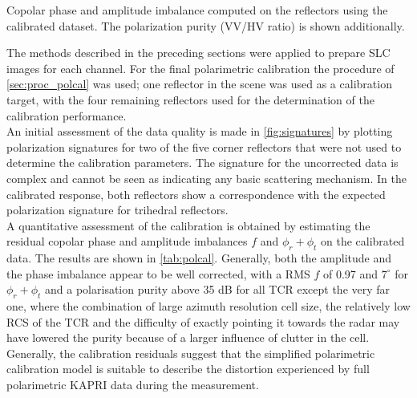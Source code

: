 								
\begin{table}[h]
	\centering
	\caption{Copolar phase and amplitude imbalance computed on the reflectors using the calibrated dataset. The polarization purity (VV/HV ratio) is shown additionally.}
	\label{tab:polcal}
\end{table}		
The methods described in the preceding sections were applied to prepare SLC images for each channel. For the final polarimetric calibration the procedure of \autoref{sec:proc_polcal} was used; one reflector in the scene was used as a calibration target, with the four remaining reflectors used for the determination of the calibration performance.\\
An initial assessment of the data quality is made in \autoref{fig:signatures}  by plotting polarization signatures\cite{VanZyl1987} for two of the five corner reflectors that were not used to determine the calibration parameters.
The signature for the uncorrected data is complex and cannot be seen as indicating any basic scattering mechanism. In the calibrated response, both reflectors show a correspondence with the expected polarization signature for trihedral reflectors.\\
A quantitative assessment of the calibration is obtained by estimating the residual copolar phase and amplitude imbalances $f$ and $\phi_r + \phi_t$ on the calibrated data. The results are shown in \autoref{tab:polcal}. Generally, both the amplitude and the phase imbalance appear to be well corrected, with a RMS $f$ of 0.97 and $7^\circ$ for $\phi_r + \phi_t$ and a polarisation purity above 35 dB for all TCR except the very far one, where the combination of large azimuth resolution cell size, the relatively low RCS of the TCR and  the difficulty of exactly pointing it towards the radar may have lowered the purity because of a larger influence of clutter in the cell.\\ Generally, the calibration residuals suggest that the simplified polarimetric calibration model is suitable to describe the distortion experienced by full polarimetric KAPRI data during the measurement.

